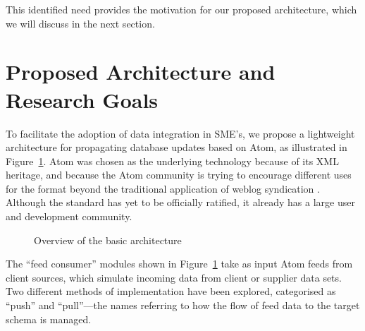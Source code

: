 \documentclass{CRPITStyle}
\begin{document}
This identified need provides the motivation for our proposed
architecture, which we will discuss in the next section.


\section{Proposed Architecture and Research Goals}
\label{sec-architecture}

To facilitate the adoption of data integration in SME's, we propose a
lightweight architecture for propagating database updates based on Atom,
as illustrated in Figure~\ref{fig-basic}. Atom was chosen as the
underlying technology because of its XML heritage, and because the Atom
community is trying to encourage different uses for the format beyond
the traditional application of weblog syndication
\cite{Nott-M-2005-Atom}. Although the standard has yet to be officially
ratified, it already has a large user and development community.

\begin{figure}[htb]
	\caption{Overview of the basic architecture}
	\label{fig-basic}
\end{figure}

The ``feed consumer'' modules shown in Figure~\ref{fig-basic} take as
input Atom feeds from client sources, which simulate incoming data from
client or supplier data sets. Two different methods of implementation
have been explored, categorised as ``push'' and ``pull''---the names
referring to how the flow of feed data to the target schema is managed.
\end{document}
